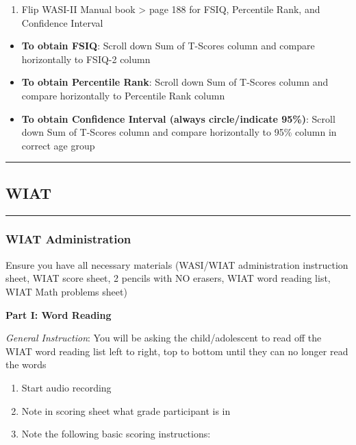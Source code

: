 \documentclass[]{book}
\providecommand{\tightlist}{%
  \setlength{\itemsep}{0pt}\setlength{\parskip}{0pt}}
\begin{document}
\begin{enumerate}
\def\labelenumi{\arabic{enumi}.}
\setcounter{enumi}{2}
\tightlist
\item
  Flip WASI-II Manual book \textgreater{} page 188 for FSIQ, Percentile
  Rank, and Confidence Interval
\end{enumerate}

\begin{itemize}
\tightlist
\item
  \textbf{To obtain FSIQ}: Scroll down Sum of T-Scores column and
  compare horizontally to FSIQ-2 column
\item
  \textbf{To obtain Percentile Rank}: Scroll down Sum of T-Scores column
  and compare horizontally to Percentile Rank column
\item
  \textbf{To obtain Confidence Interval (always circle/indicate 95\%)}:
  Scroll down Sum of T-Scores column and compare horizontally to 95\%
  column in correct age group
\end{itemize}

\begin{center}\rule{0.5\linewidth}{0.5pt}\end{center}

\subsection{WIAT}\label{wiat}

\begin{center}\rule{0.5\linewidth}{0.5pt}\end{center}

\subsubsection{WIAT Administration}\label{wiat-administration}

Ensure you have all necessary materials (WASI/WIAT administration
instruction sheet, WIAT score sheet, 2 pencils with NO erasers, WIAT
word reading list, WIAT Math problems sheet)

\textbf{Part I: Word Reading}

\emph{General Instruction}: You will be asking the child/adolescent to
read off the WIAT word reading list left to right, top to bottom until
they can no longer read the words

\begin{enumerate}
\def\labelenumi{\arabic{enumi}.}
\tightlist
\item
  Start audio recording
\item
  Note in scoring sheet what grade participant is in
\item
  Note the following basic scoring instructions:
\end{enumerate}
\end{document}
